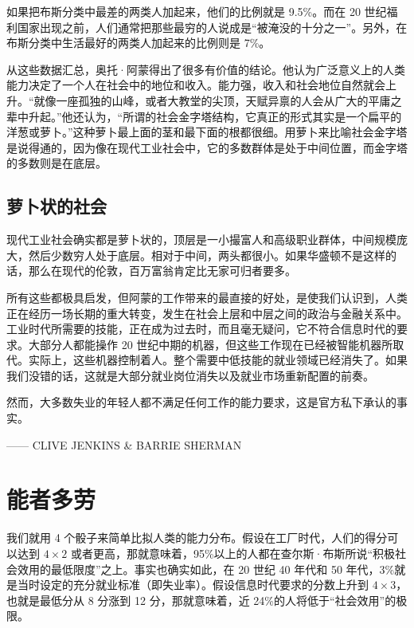 如果把布斯分类中最差的两类人加起来，他们的比例就是 9.5\%。而在 20 世纪福利国家出现之前，人们通常把那些最穷的人说成是“被淹没的十分之一”。另外，在布斯分类中生活最好的两类人加起来的比例则是 7\%。

从这些数据汇总，奥托·阿蒙得出了很多有价值的结论。他认为广泛意义上的人类能力决定了一个人在社会中的地位和收入。能力强，收入和社会地位自然就会上升。“就像一座孤独的山峰，或者大教堂的尖顶，天赋异禀的人会从广大的平庸之辈中升起。”他还认为，“所谓的社会金字塔结构，它真正的形式其实是一个扁平的洋葱或萝卜。”这种萝卜最上面的茎和最下面的根都很细。用萝卜来比喻社会金字塔是说得通的，因为像在现代工业社会中，它的多数群体是处于中间位置，而金字塔的多数则是在底层。

\subsection{萝卜状的社会}
现代工业社会确实都是萝卜状的，顶层是一小撮富人和高级职业群体，中间规模庞大，然后少数穷人处于底层。相对于中间，两头都很小。如果华盛顿不是这样的话，那么在现代的伦敦，百万富翁肯定比无家可归者要多。

所有这些都极具启发，但阿蒙的工作带来的最直接的好处，是使我们认识到，人类正在经历一场长期的重大转变，发生在社会上层和中层之间的政治与金融关系中。工业时代所需要的技能，正在成为过去时，而且毫无疑问，它不符合信息时代的要求。大部分人都能操作 20 世纪中期的机器，但这些工作现在已经被智能机器所取代。实际上，这些机器控制着人。整个需要中低技能的就业领域已经消失了。如果我们没错的话，这就是大部分就业岗位消失以及就业市场重新配置的前奏。


\begin{tcolorbox}
\kaishu 然而，大多数失业的年轻人都不满足任何工作的能力要求，这是官方私下承认的事实。
\begin{flushright}
—— CLIVE JENKINS \& BARRIE SHERMAN
\end{flushright}
\end{tcolorbox}

\section{能者多劳}
我们就用 4 个骰子来简单比拟人类的能力分布。假设在工厂时代，人们的得分可以达到 $ 4 \times 2 $ 或者更高，那就意味着，95\%以上的人都在查尔斯·布斯所说“积极社会效用的最低限度”之上。事实也确实如此，在 20 世纪 40 年代和 50 年代，3\%就是当时设定的充分就业标准（即失业率）。假设信息时代要求的分数上升到 $ 4 \times 3 $，也就是最低分从 8 分涨到 12 分，那就意味着，近 24\%的人将低于“社会效用”的极限。

